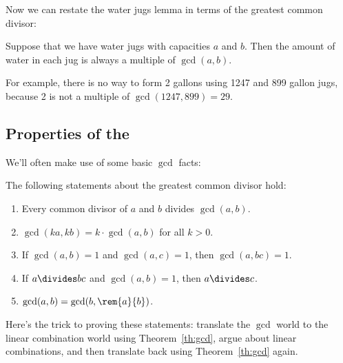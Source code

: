Now we can restate the water jugs lemma in terms of the greatest
common divisor:
\begin{corollary}
\label{cor:waterjugs}
Suppose that we have water jugs with capacities $a$ and $b$.  Then the
amount of water in each jug is always a multiple of $\gcd(a, b)$.
\end{corollary}

For example, there is no way to form 2 gallons using 1247 and 899 gallon
jugs, because 2 is not a multiple of $\gcd(1247, 899) = 29$.

\subsection{Properties of the }

We'll often make use of some basic $\gcd$ facts:

\begin{lemma} The following statements about the greatest common divisor hold:
\label{lem:gcd}
%
\begin{enumerate}
\item Every common divisor of $a$ and $b$ divides $\gcd(a, b)$.
\item\label{gcd2} $\gcd(k a, k b) = k \cdot \gcd(a, b)$ for all $k > 0$.
\item\label{gcd3} If $\gcd(a, b) = 1$ and $\gcd(a, c) = 1$, then $\gcd(a, bc) =
1$.
\item\label{gcd4} If $a \divides b c$ and $\gcd(a, b) = 1$, then $a \divides c$.
\item\label{gcd5} $\gcd(a, b) = \gcd(b, \rem{a}{b})$.
\end{enumerate}
\end{lemma}

Here's the trick to proving these statements: translate the $\gcd$
world to the linear combination world using Theorem~\ref{th:gcd},
argue about linear combinations, and then translate back using
Theorem~\ref{th:gcd} again.

